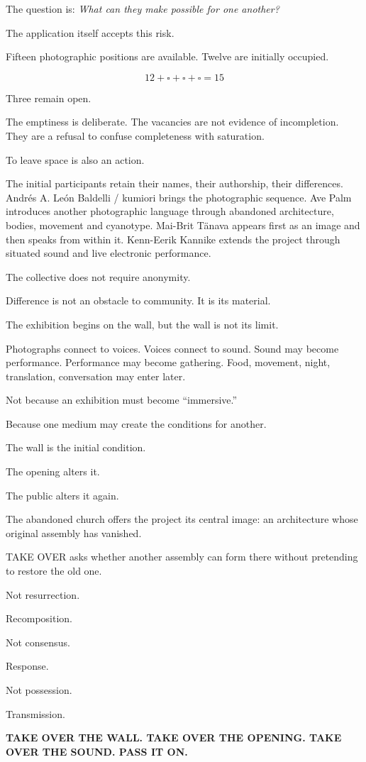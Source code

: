 The question is: \emph{What can they make possible for one another?}

The application itself accepts this risk.

Fifteen photographic positions are available. Twelve are initially
occupied.

\[
12+\square+\square+\square=15
\]

Three remain open.

The emptiness is deliberate. The vacancies are not evidence of
incompletion. They are a refusal to confuse completeness with
saturation.

To leave space is also an action.

The initial participants retain their names, their authorship, their
differences. Andrés A. León Baldelli / kumiori brings the photographic
sequence. Ave Palm introduces another photographic language through
abandoned architecture, bodies, movement and cyanotype. Mai-Brit Tänava
appears first as an image and then speaks from within it. Kenn-Eerik
Kannike extends the project through situated sound and live electronic
performance.

The collective does not require anonymity.

Difference is not an obstacle to community. It is its material.

The exhibition begins on the wall, but the wall is not its limit.

Photographs connect to voices. Voices connect to sound. Sound may become
performance. Performance may become gathering. Food, movement, night,
translation, conversation may enter later.

Not because an exhibition must become ``immersive.''

Because one medium may create the conditions for another.

The wall is the initial condition.

The opening alters it.

The public alters it again.

The abandoned church offers the project its central image: an
architecture whose original assembly has vanished.

TAKE OVER asks whether another assembly can form there without
pretending to restore the old one.

Not resurrection.

Recomposition.

Not consensus.

Response.

Not possession.

Transmission.

\textbf{TAKE OVER THE WALL. TAKE OVER THE OPENING. TAKE OVER THE SOUND.
PASS IT ON.}
